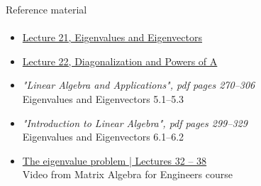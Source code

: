 \documentclass[aspectratio=169]{beamer}
\newcommand{\fbckg}[1]{\usebackgroundtemplate{\texttt{[image: \#1]}}}%
\begin{document}
\begin{frame}[t]{Reference material}
    \framesubtitle{}
    \Large
    \begin{itemize}
        \item \href{https://www.youtube.com/watch?v=lXNXrLcoerU&list=PL49CF3715CB9EF31D&index=21}{Lecture 21, Eigenvalues and Eigenvectors}
        \item \href{https://www.youtube.com/watch?v=13r9QY6cmjc&list=PL49CF3715CB9EF31D&index=22}{Lecture 22, Diagonalization and Powers of A}
        \item \textit{"Linear Algebra and Applications", pdf pages 270--306 }\\ Eigenvalues and Eigenvectors 5.1--5.3
        \item \textit{"Introduction to Linear Algebra", pdf pages 299--329 }\\ Eigenvalues and Eigenvectors 6.1--6.2
        \item  \href{https://www.youtube.com/watch?v=29keVZGvqME&list=PLkZjai-2Jcxlg-Z1roB0pUwFU-P58tvOx&index=34}{The eigenvalue problem | Lectures 32 -- 38}\\ Video from Matrix Algebra for Engineers course
    \end{itemize}
\end{frame}

\fbckg{fibeamer/figs/last_page.png}
\frame[plain]{}
\end{document}
